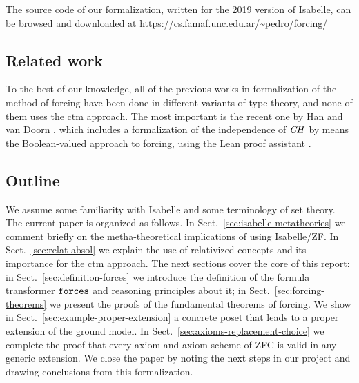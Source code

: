 The source code of our formalization, written for the 2019 version of
Isabelle, can be browsed and downloaded at
\url{https://cs.famaf.unc.edu.ar/~pedro/forcing/}


\subsection{Related work}
To the best of our knowledge, all of the previous works in
formalization of the method 
of forcing have been done in different variants of type theory, and
none of them uses the ctm approach. The
most important is the recent one by 
Han and van Doorn
\cite{han_et_al:LIPIcs:2019:11074,DBLP:conf/cpp/HanD20}, which includes
a formalization of the independence of $\mathit{CH}$ by means
the Boolean-valued approach to forcing, using the Lean
proof assistant \cite{DBLP:conf/cade/MouraKADR15}.

\subsection*{Outline}
\label{sec:outline}

We assume some familiarity with Isabelle and some terminology of set
theory. The current paper is organized as follows. In
Sect.~\ref{sec:isabelle-metatheories} we comment briefly on the
metha-theoretical implications of using Isabelle/ZF. In
Sect.~\ref{sec:relat-absol} we explain the use of relativized concepts
and its importance for the ctm approach. The next sections cover the
core of this report: in Sect.~\ref{sec:definition-forces} we introduce
the definition of the formula transformer $\mathop{\mathtt{forces}}$ and reasoning
principles about it; in Sect.~\ref{sec:forcing-theorems} we present
the proofs of the fundamental theorems of forcing. We show in
Sect.~\ref{sec:example-proper-extension} a concrete poset that leads
to a proper extension of the ground model. In
Sect.~\ref{sec:axioms-replacement-choice} we complete the proof that
every axiom and axiom scheme of ZFC is valid in any generic extension.
We close the paper by noting the next steps in our project and drawing
conclusions from this formalization.

